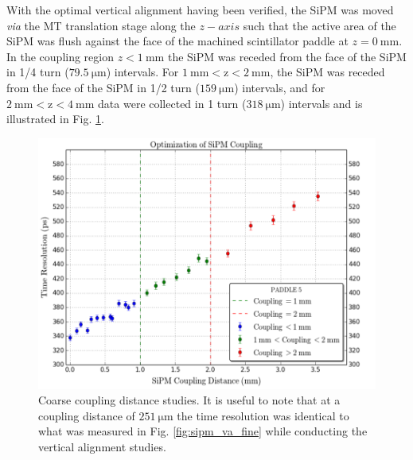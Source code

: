 With the optimal vertical alignment having been verified, the SiPM was moved \textit{via} the MT translation stage along the $z-axis$ such that the active area of the SiPM was flush against the face of the machined scintillator paddle at $z = 0\ \mathrm{mm}$.  In the coupling region $z < 1\ \mathrm{mm}$ the SiPM was receded from the face of the SiPM in 1/4 turn ($79.5\ \mathrm{\mu m}$) intervals.  For $\mathrm{1\ mm < z < 2\ mm}$, the SiPM was receded from the face of the SiPM in 1/2 turn ($159\ \mathrm{\mu m}$) intervals, and for $\mathrm{2\ mm < z < 4\ mm}$ data were collected in 1 turn ($\mathrm{318\ \mu m}$) intervals and is illustrated in Fig. \ref{fig:sipm_coupling_coarse}.
\begin{figure}[!htb]
	\centering
	\includegraphics[width=1.0\columnwidth]{misalignment/figs/sipm_coupling_coarse}
	\caption{Coarse coupling distance studies.  It is useful to note that at a coupling distance of $\mathrm{251\ \mu m}$ the time resolution was identical to what was measured in Fig. \ref{fig:sipm_va_fine} while conducting the vertical alignment studies.}
	\label{fig:sipm_coupling_coarse}
\end{figure}

